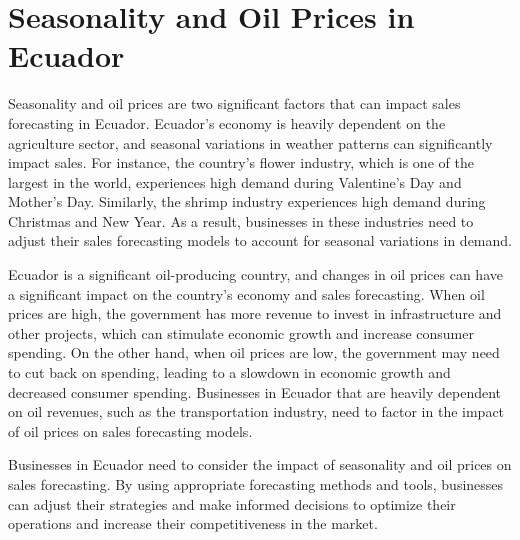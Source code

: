 \section{Seasonality and Oil Prices in Ecuador}

Seasonality and oil prices are two significant factors that can impact sales forecasting in Ecuador. Ecuador's economy is heavily dependent on the agriculture sector, and seasonal variations in weather patterns can significantly impact sales. For instance, the country's flower industry, which is one of the largest in the world, experiences high demand during Valentine's Day and Mother's Day. Similarly, the shrimp industry experiences high demand during Christmas and New Year. As a result, businesses in these industries need to adjust their sales forecasting models to account for seasonal variations in demand.

Ecuador is a significant oil-producing country, and changes in oil prices can have a significant impact on the country's economy and sales forecasting. When oil prices are high, the government has more revenue to invest in infrastructure and other projects, which can stimulate economic growth and increase consumer spending. On the other hand, when oil prices are low, the government may need to cut back on spending, leading to a slowdown in economic growth and decreased consumer spending. Businesses in Ecuador that are heavily dependent on oil revenues, such as the transportation industry, need to factor in the impact of oil prices on sales forecasting models.

Businesses in Ecuador need to consider the impact of seasonality and oil prices on sales forecasting. By using appropriate forecasting methods and tools, businesses can adjust their strategies and make informed decisions to optimize their operations and increase their competitiveness in the market.
